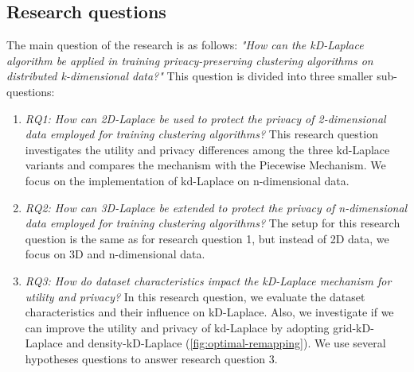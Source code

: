 \subsection{Research questions}
The main question of the research is as follows: \newline \newline
\textit{"How can the kD-Laplace algorithm be applied in training privacy-preserving clustering algorithms on distributed k-dimensional data?"} \newline
This question is divided into three smaller sub-questions:
\begin{enumerate}
      \item \textit{RQ1: How can 2D-Laplace be used to protect the privacy of 2-dimensional data employed for training clustering algorithms?} \newline
            This research question investigates the utility and privacy differences among the three kd-Laplace variants and compares the mechanism with the Piecewise Mechanism.
            We focus on the implementation of kd-Laplace on n-dimensional data.
      \item \textit{RQ2: How can 3D-Laplace be extended to protect the privacy of n-dimensional data employed for training clustering algorithms?} \newline
            The setup for this research question is the same as for research question 1, but instead of 2D data, we focus on 3D and n-dimensional data.
      \item \textit{RQ3: How do dataset characteristics impact the kD-Laplace mechanism for utility and privacy?} \newline
            In this research question, we evaluate the dataset characteristics and their influence on kD-Laplace.
            Also, we investigate if we can improve the utility and privacy of kd-Laplace by adopting grid-kD-Laplace and density-kD-Laplace (\ref{fig:optimal-remapping}).
            We use several hypotheses questions to answer research question 3.


\end{enumerate}
